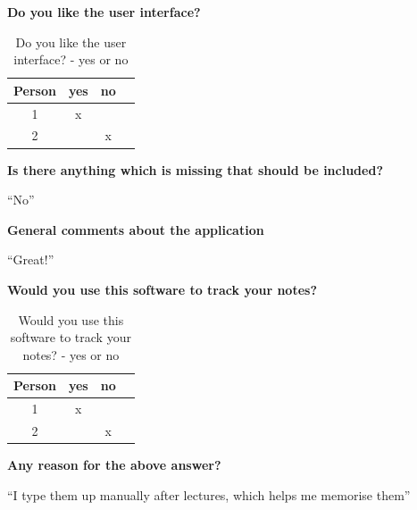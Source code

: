 \noindent
\textbf{Do you like the user interface?}
\begin{table}[h!]
\centering
 \begin{tabular}{||c c c c||}
 \hline
   Person & yes & no \\ [0.5ex]
 \hline\hline
    1 & x &  \\
    2 & & x  \\
 \hline
  \end{tabular}
  \caption{Do you like the user interface? - yes or no}
\end{table}

\noindent
\textbf{Is there anything which is missing that should be included?}

``No''

\noindent
\textbf{General comments about the application}

``Great!''

\noindent
\textbf{Would you use this software to track your notes?}
\begin{table}[h!]
\centering
 \begin{tabular}{||c c c c||}
 \hline
   Person & yes & no \\ [0.5ex]
 \hline\hline
    1 & x &  \\
    2 & & x  \\
 \hline
  \end{tabular}
  \caption{Would you use this software to track your notes? - yes or no}
\end{table}

\noindent
\textbf{Any reason for the above answer?}

``I type them up manually after lectures, which helps me memorise them''
